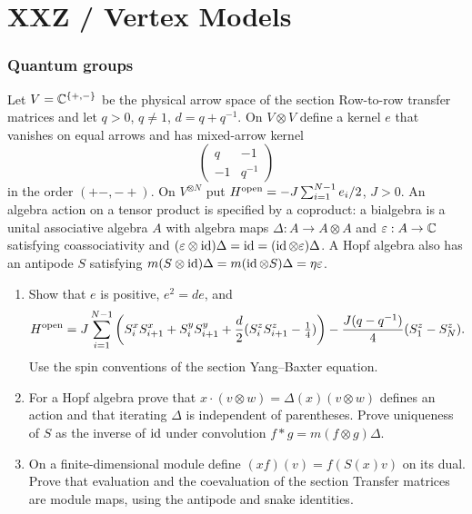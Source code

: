 \part{XXZ / Vertex Models}

\section{Quantum groups}

\begin{exercise}
Let $V=\mathbb C^{\{+,-\}}$ be the physical arrow space of the section
Row-to-row transfer matrices and let $q>0$, $q\ne1$,
$d=q+q^{-1}$. On $V\otimes V$ define a kernel $e$ that vanishes
on equal arrows and has mixed-arrow kernel
\[
 \begin{pmatrix}q&-1\\-1&q^{-1}\end{pmatrix}
\]
in the order $(+-,-+)$. On $V^{\otimes N}$ put
$H^{\rm open}=-J\sum_{i=1}^{N-1}e_i/2$, $J>0$.
An algebra action on a tensor product is specified by a coproduct:
a bialgebra is a unital associative algebra $A$ with algebra maps
$\Delta:A\to A\otimes A$ and $\varepsilon:A\to\mathbb C$ satisfying
coassociativity and
$(\varepsilon\otimes\operatorname{id})\Delta=\operatorname{id}=(\operatorname{id}\otimes\varepsilon)\Delta$.
A Hopf algebra also has an antipode $S$ satisfying
$m(S\otimes\operatorname{id})\Delta=m(\operatorname{id}\otimes S)\Delta=\eta\varepsilon$.
\begin{enumerate}[label=(\alph*)]
\item Show that $e$ is positive, $e^2=de$, and
\[
 H^{\rm open}=J\sum_{i=1}^{N-1}
 \left(S_i^xS_{i+1}^x+S_i^yS_{i+1}^y
 +\frac d2(S_i^zS_{i+1}^z-\tfrac14)\right)
 -\frac{J(q-q^{-1})}{4}(S_1^z-S_N^z).
\]
Use the spin conventions of the section Yang--Baxter equation.
\item For a Hopf algebra prove that
$x\cdot(v\otimes w)=\Delta(x)(v\otimes w)$ defines an action
and that iterating $\Delta$ is independent of parentheses.
Prove uniqueness of $S$ as the inverse of $\operatorname{id}$ under convolution
$f*g=m(f\otimes g)\Delta$.
\item On a finite-dimensional module define
$(xf)(v)=f(S(x)v)$ on its dual. Prove that evaluation and the
coevaluation of the section Transfer matrices are module maps,
using the antipode and snake identities.
\end{enumerate}
\end{exercise}

